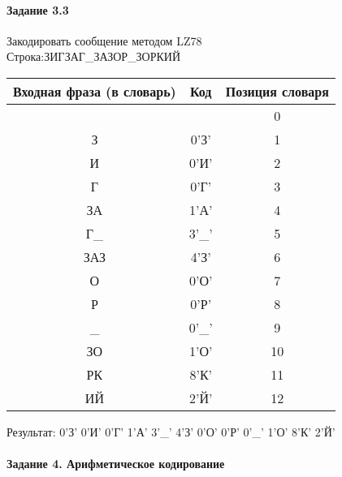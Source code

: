 \documentclass[a4paper, 12pt]{article}
\begin{document}
\paragraph{Задание 3.3}

Закодировать сообщение методом LZ78\\
Строка:ЗИГЗАГ\_ЗАЗОР\_ЗОРКИЙ\\
\begin{table}[h!]
\centering
\begin{tabular}{|c|c|c|} 
\hline
 Входная фраза (в словарь) & Код & Позиция словаря \\ \hline

 &  & 0 \\ \hline
З & 0'З' & 1 \\ \hline
И & 0'И' & 2 \\ \hline
Г & 0'Г' & 3 \\ \hline
ЗА & 1'А' & 4 \\ \hline
Г\_ & 3'\_' & 5 \\ \hline
ЗАЗ & 4'З' & 6 \\ \hline
О & 0'О' & 7 \\ \hline
Р & 0'Р' & 8 \\ \hline
\_ & 0'\_' & 9 \\ \hline
ЗО & 1'О' & 10 \\ \hline
РК & 8'К' & 11 \\ \hline
ИЙ & 2'Й' & 12 \\ \hline
\end{tabular}
\end{table}

Результат: 0'З' 0'И' 0'Г' 1'А' 3'\_' 4'З' 0'О' 0'Р' 0'\_' 1'О' 8'К' 2'Й'\\
\pagebreak
\paragraph{Задание 4. Арифметическое кодирование\\}
\end{document}
